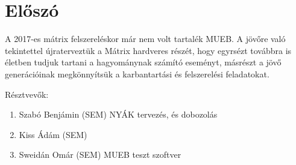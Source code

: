 \chapter*{Előszó}

A 2017-es mátrix felszereléskor már nem volt tartalék MUEB. A jövőre való tekintettel újraterveztük a Mátrix hardveres részét, hogy egyrsézt továbbra is életben tudjuk tartani a hagyománynak számító eseményt, másrészt a jövő generációinak megkönnyítsük a karbantartási és felszerelési feladatokat.

\par
Résztvevők:
\begin{enumerate} %
 \item Szabó Benjámin (SEM)  NYÁK tervezés, és dobozolás
 \item Kiss Ádám (SEM)
 \item Sweidán Omár (SEM) MUEB teszt szoftver
\end{enumerate}

